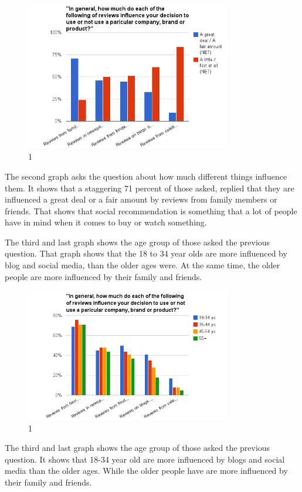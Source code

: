 \begin{figure}[htb]
\centering
\includegraphics[width=0.8\textwidth]{Images/teori2.png}
\caption{1}
\label{Teori2}
\end{figure}

The second graph asks the question about how much different things influence them. It shows that a staggering 71 percent of those asked, replied that they are influenced a great deal or a fair amount by reviews from family members or friends. That shows that social recommendation is something that a lot of people have in mind when it comes to buy or watch something.

The third and last graph shows the age group of those asked the previous question. That graph shows that the 18 to 34 year olds are more influenced by blog and social media, than the older ages were. At the same time, the older people are more influenced by their family and friends.

\begin{figure}[htb]
\centering
\includegraphics[width=0.8\textwidth]{Images/teori3.png}
\caption{1}
\label{Teori3}
\end{figure}

The third and last graph shows the age group of those asked the previous question. It shows that 18-34 year old are more influenced by blogs and social media than the older ages. While the older people have are more influenced by their family and friends.